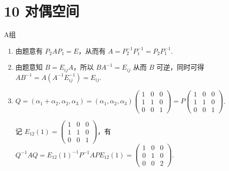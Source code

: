 \section*{10 对偶空间}

\vspace{2ex}

\centerline{\heiti A组}
\begin{enumerate}
    \item 由题意有 $P_2AP_1 = E$，从而有 $A=P_2^{-1}P_1^{-1}=P_2P_1^{-1}$.

    \item 由题意知 $B = E_{ij}A$，所以 $BA^{-1}=E_{ij}$ 从而 $B$ 可逆，同时可得 $AB^{-1}=A(A^{-1}E_{ij}^{-1})=E_{ij}$.

    \item $Q = (\alpha_1+\alpha_2,\alpha_2,\alpha_3)=(\alpha_1,\alpha_2,\alpha_3)\begin{pmatrix}1 & 0 & 0 \\ 1 & 1 & 0 \\ 0 & 0 & 1\end{pmatrix}=P\begin{pmatrix}1 & 0 & 0 \\ 1 & 1 & 0 \\ 0 & 0 & 1\end{pmatrix}$.

          记 $E_{12}(1)=\begin{pmatrix}1 & 0 & 0 \\ 1 & 1 & 0 \\ 0 & 0 & 1\end{pmatrix}$，有 $Q^{-1}AQ=E_{12}(1)^{-1}P^{-1}APE_{12}(1)=\begin{pmatrix}1 & 0 & 0 \\ 0 & 1 & 0 \\ 0 & 0 & 2\end{pmatrix}$.


\end{enumerate}
